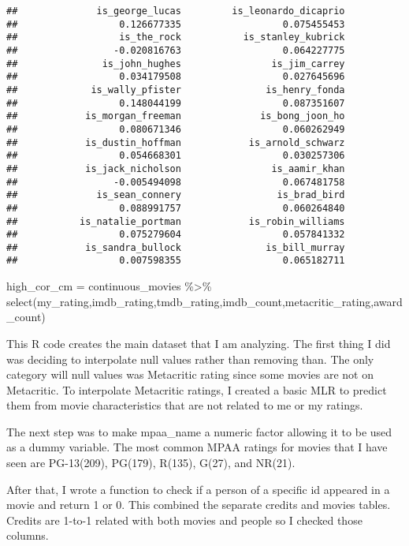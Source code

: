 \documentclass[
]{article}
\newenvironment{Shaded}{\begin{snugshade}}{\end{snugshade}}
\newcommand{\FunctionTok}[1]{\textcolor[rgb]{0.00,0.00,0.00}{#1}}
\newcommand{\NormalTok}[1]{#1}
\newcommand{\OtherTok}[1]{\textcolor[rgb]{0.56,0.35,0.01}{#1}}
\newcommand{\SpecialCharTok}[1]{\textcolor[rgb]{0.00,0.00,0.00}{#1}}
\begin{document}
\begin{verbatim}
##              is_george_lucas         is_leonardo_dicaprio 
##                  0.126677335                  0.075455453 
##                  is_the_rock           is_stanley_kubrick 
##                 -0.020816763                  0.064227775 
##               is_john_hughes                is_jim_carrey 
##                  0.034179508                  0.027645696 
##             is_wally_pfister               is_henry_fonda 
##                  0.148044199                  0.087351607 
##            is_morgan_freeman              is_bong_joon_ho 
##                  0.080671346                  0.060262949 
##            is_dustin_hoffman            is_arnold_schwarz 
##                  0.054668301                  0.030257306 
##            is_jack_nicholson                is_aamir_khan 
##                 -0.005494098                  0.067481758 
##              is_sean_connery                 is_brad_bird 
##                  0.088991757                  0.060264840 
##           is_natalie_portman            is_robin_williams 
##                  0.075279604                  0.057841332 
##            is_sandra_bullock               is_bill_murray 
##                  0.007598355                  0.065182711
\end{verbatim}

\begin{Shaded}
\begin{Highlighting}[]
\NormalTok{high\_cor\_cm }\OtherTok{=}\NormalTok{ continuous\_movies }\SpecialCharTok{\%\textgreater{}\%} \FunctionTok{select}\NormalTok{(my\_rating,imdb\_rating,tmdb\_rating,imdb\_count,metacritic\_rating,award\_count)}
\end{Highlighting}
\end{Shaded}

This R code creates the main dataset that I am analyzing. The first
thing I did was deciding to interpolate null values rather than removing
than. The only category will null values was Metacritic rating since
some movies are not on Metacritic. To interpolate Metacritic ratings, I
created a basic MLR to predict them from movie characteristics that are
not related to me or my ratings.

The next step was to make mpaa\_name a numeric factor allowing it to be
used as a dummy variable. The most common MPAA ratings for movies that I
have seen are PG-13(209), PG(179), R(135), G(27), and NR(21).

After that, I wrote a function to check if a person of a specific id
appeared in a movie and return 1 or 0. This combined the separate
credits and movies tables. Credits are 1-to-1 related with both movies
and people so I checked those columns.
\end{document}
